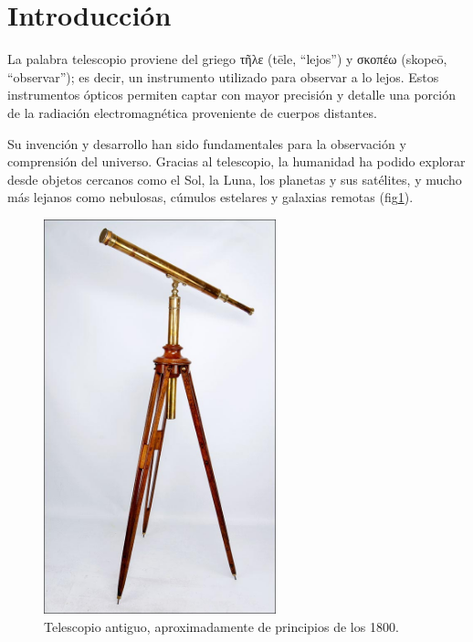 
\section{Introducción}

La palabra telescopio proviene del griego \foreignlanguage{greek}{τῆλε} (tēle, “lejos”) y \foreignlanguage{greek}{σκοπέω} (skopeō, “observar”); es decir, un instrumento utilizado para observar a lo lejos. Estos instrumentos ópticos permiten captar con mayor precisión y detalle una porción de la radiación electromagnética proveniente de cuerpos distantes.

Su invención y desarrollo han sido fundamentales para la observación y comprensión del universo. Gracias al telescopio, la humanidad ha podido explorar desde objetos cercanos como el Sol, la Luna, los planetas y sus satélites, y mucho más lejanos como nebulosas, cúmulos estelares y galaxias remotas (fig\ref{fig:telescopio_antiguo}).

\begin{figure}[H]
	\centering
	\includegraphics[width=0.6\textwidth]{images/telescopio_antiguo.jpg}
	\caption{Telescopio antiguo, aproximadamente de principios de los 1800.}
	\label{fig:telescopio_antiguo}
\end{figure}


